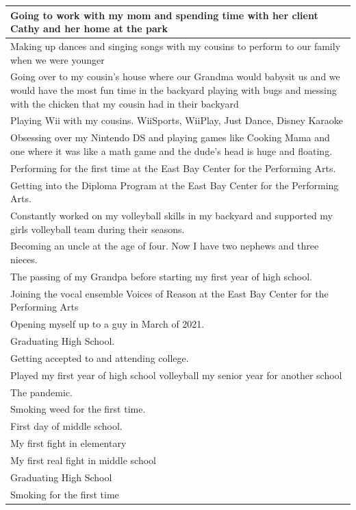 \documentclass[
  .7em,
  letterpaper,
  DIV=11,
  numbers=noendperiod]{scrartcl}
\begin{document}
\begin{table}
\begin{tabular}{l}
\hline
Going to work with my mom and spending time with her client Cathy and her home at the park\\
\hline
Making up dances and singing songs with my cousins to perform to our family when we were younger\\
\hline
Going over to my cousin's house where our Grandma would babysit us and we would have the most fun time in the backyard playing with bugs and messing with the chicken that my cousin had in their backyard\\
\hline
Playing Wii with my cousins. WiiSports, WiiPlay, Just Dance, Disney Karaoke\\
\hline
Obsessing over my Nintendo DS and playing games like Cooking Mama and one where it was like a math game and the dude's head is huge and floating.\\
\hline
Performing for the first time at the East Bay Center for the Performing Arts.\\
\hline
Getting into the Diploma Program at the East Bay Center for the Performing Arts.\\
\hline
Constantly worked on my volleyball skills in my backyard and supported my girls volleyball team during their seasons.\\
\hline
Becoming an uncle at the age of four. Now I have two nephews and three nieces.\\
\hline
The passing of my Grandpa before starting my first year of high school.\\
\hline
Joining the vocal ensemble Voices of Reason at the East Bay Center for the Performing Arts\\
\hline
Opening myself up to a guy in March of 2021.\\
\hline
Graduating High School.\\
\hline
Getting accepted to and attending college.\\
\hline
Played my first year of high school volleyball my senior year for another school\\
\hline
The pandemic.\\
\hline
Smoking weed for the first time.\\
\hline
First day of middle school.\\
\hline
My first fight in elementary\\
\hline
My first real fight in middle school\\
\hline
Graduating High School\\
\hline
Smoking for the first time\\
\hline

\end{tabular}
\end{table}
\end{document}
